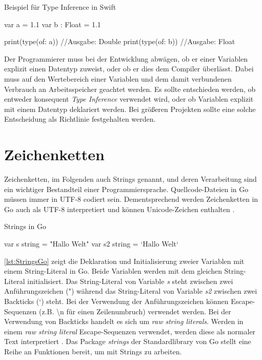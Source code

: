 \begin{listing}[H]
\caption{Beispiel für Type Inference in Swift}
\label{lst:TypeInferenceSwift2}
\begin{SwiftCode}
var a = 1.1
var b : Float = 1.1

print(type(of: a)) //Ausgabe: Double
print(type(of: b)) //Ausgabe: Float
\end{SwiftCode}
\end{listing}

Der Programmierer muss bei der Entwicklung abwägen, ob er einer Variablen explizit einen Datentyp zuweist, oder ob er dies dem Compiler überlässt. 
Dabei muss auf den Wertebereich einer Variablen und dem damit verbundenen Verbrauch an Arbeitsspeicher geachtet werden. 
Es sollte entschieden werden, ob entweder konsequent \emph{Type Inference} verwendet wird, oder ob Variablen explizit mit einem Datentyp deklariert werden. 
Bei größeren Projekten sollte eine solche Entscheidung als Richtlinie festgehalten werden.

\section{Zeichenketten}
Zeichenketten, im Folgenden auch Strings genannt, und deren Verarbeitung sind ein wichtiger Bestandteil einer Programmiersprache. 
Quellcode-Dateien in Go müssen immer in UTF-8 codiert sein. 
Dementsprechend werden Zeichenketten in Go auch als UTF-8 interpretiert und können Unicode-Zeichen enthalten \cite[S.117]{Donovan.2016}.

\begin{listing}[H]
\caption{Strings in Go}
\label{lst:StringsGo}
\begin{GoCode}
var s string = "Hallo Welt"
var s2 string = `Hallo Welt`
\end{GoCode}
\end{listing}

\autoref{lst:StringsGo} zeigt die Deklaration und Initialisierung zweier Variablen mit einem String-Literal in Go.
Beide Variablen werden mit dem gleichen String-Literal initialisiert. 
Das String-Literal von Variable \emph{s} steht zwischen zwei Anführungszeichen (") während das String-Literal von Variable \emph{s2} zwischen zwei Backticks (`) steht.
Bei der Verwendung der Anführungszeichen können Escape-Sequenzen (z.B. {\textbackslash}n für einen Zeilenumbruch) verwendet werden.
Bei der Verwendung von Backticks handelt es sich um \emph{raw string literals}. 
Werden in einem \emph{raw string literal} Escape-Sequenzen verwendet, werden diese als normaler Text interpretiert \cite[S.118]{Donovan.2016}.
Das Package \emph{strings} der Standardlibrary von Go stellt eine Reihe an Funktionen bereit, um mit Strings zu arbeiten.

